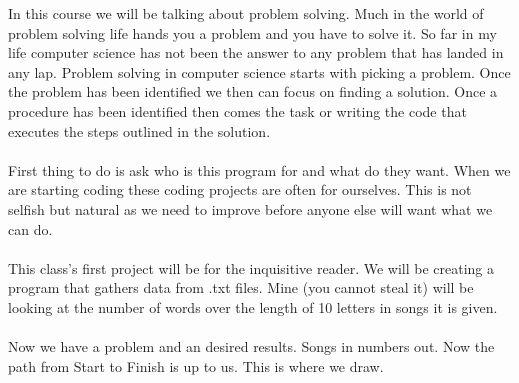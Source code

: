 \documentclass[..main.tex]{subfiles}
\begin{document}
In this course we will be talking about problem solving. Much in the world of problem solving life hands you a problem and you have to solve it. So far in my life computer science has not been the answer to any problem that has landed in any lap. Problem solving in computer science starts with picking a problem. Once the problem has been identified we then can focus on finding a solution. Once a procedure has been identified then comes the task or writing the code that executes the steps outlined in the solution. \\
\\
First thing to do is ask who is this program for and what do they want. When we are starting coding these coding projects are often for ourselves. This is not selfish but natural as we need to improve before anyone else will want what we can do. \\
\\
This class's first project will be for the inquisitive reader. We will be creating a program that gathers data from .txt files. Mine (you cannot steal it) will be looking at the number of words over the length of 10 letters in songs it is given. \\
\\
Now we have a problem and an desired results. Songs in numbers out. Now the path from Start to Finish is up to us. This is where we draw. \\
\\
\begin{center}
\end{center}
\end{document}
